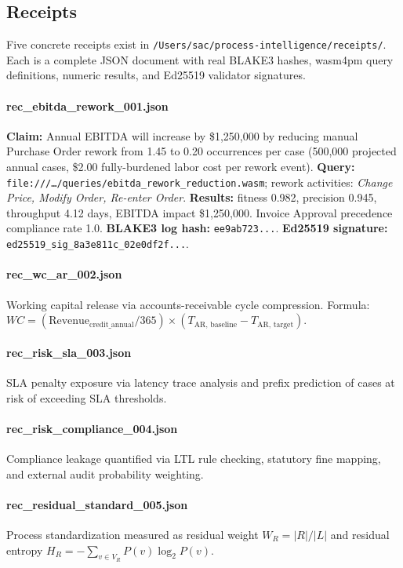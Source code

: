 \subsection{Receipts}
\label{sec:ma-evidence-receipts}

Five concrete receipts exist in \texttt{/Users/sac/process-intelligence/receipts/}. Each is
a complete JSON document with real BLAKE3 hashes, wasm4pm query definitions, numeric results,
and Ed25519 validator signatures.

\paragraph{rec\_ebitda\_rework\_001.json}
\textbf{Claim:} Annual EBITDA will increase by \$1,250,000 by reducing manual Purchase Order
rework from 1.45 to 0.20 occurrences per case (500,000 projected annual cases, \$2.00
fully-burdened labor cost per rework event). \textbf{Query:}
\texttt{file:///\ldots/queries/ebitda\_rework\_reduction.wasm}; rework activities:
\textit{Change Price, Modify Order, Re-enter Order}. \textbf{Results:} fitness 0.982,
precision 0.945, throughput 4.12 days, EBITDA impact \$1,250,000. Invoice Approval precedence
compliance rate 1.0. \textbf{BLAKE3 log hash:} \texttt{ee9ab723...}. \textbf{Ed25519
signature:} \texttt{ed25519\_sig\_8a3e811c\_02e0df2f...}.

\paragraph{rec\_wc\_ar\_002.json}
Working capital release via accounts-receivable cycle compression. Formula:
$WC = (\text{Revenue}_{\text{credit\_annual}} / 365) \times (T_{\text{AR, baseline}} -
T_{\text{AR, target}})$.

\paragraph{rec\_risk\_sla\_003.json}
SLA penalty exposure via latency trace analysis and prefix prediction of cases at risk of
exceeding SLA thresholds.

\paragraph{rec\_risk\_compliance\_004.json}
Compliance leakage quantified via LTL rule checking, statutory fine mapping, and external
audit probability weighting.

\paragraph{rec\_residual\_standard\_005.json}
Process standardization measured as residual weight $W_R = |R| / |L|$ and residual entropy
$H_R = -\sum_{v \in V_R} P(v) \log_2 P(v)$.

